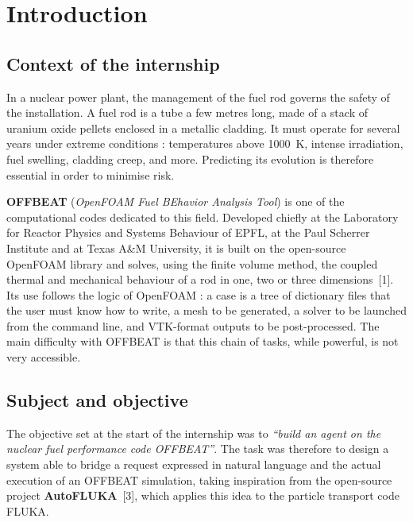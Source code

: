 \chapter*{Introduction}

\section*{Context of the internship}

In a nuclear power plant, the management of the fuel rod governs the safety of
the installation. A fuel rod is a tube a few metres long, made of a stack of
uranium oxide pellets enclosed in a metallic cladding. It must operate for
several years under extreme conditions : temperatures above \SI{1000}{\kelvin},
intense irradiation, fuel swelling, cladding creep, and more. Predicting its
evolution is therefore essential in order to minimise risk.

\textbf{OFFBEAT} (\textit{OpenFOAM Fuel BEhavior Analysis Tool}) is one of the
computational codes dedicated to this field. Developed chiefly at the Laboratory
for Reactor Physics and Systems Behaviour of EPFL, at the Paul Scherrer
Institute and at Texas A\&M University, it is built on the open-source OpenFOAM
library and solves, using the finite volume method, the coupled thermal and
mechanical behaviour of a rod in one, two or three dimensions~[1]. Its use
follows the logic of OpenFOAM : a case is a tree of dictionary files that the
user must know how to write, a mesh to be generated, a solver to be launched
from the command line, and VTK-format outputs to be post-processed. The main
difficulty with OFFBEAT is that this chain of tasks, while powerful, is not very
accessible.

\section*{Subject and objective}

The objective set at the start of the internship was to \textit{``build an agent
on the nuclear fuel performance code OFFBEAT''}. The task was therefore to design
a system able to bridge a request expressed in natural language and the actual
execution of an OFFBEAT simulation, taking inspiration from the open-source
project \textbf{AutoFLUKA}~[3], which applies this idea to the particle
transport code FLUKA.

